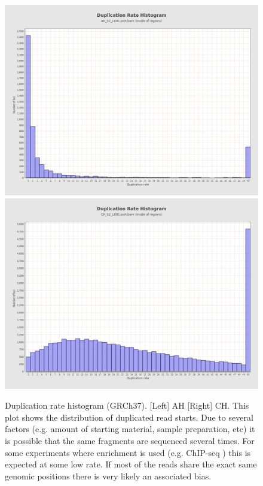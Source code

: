 \documentclass{article}
\begin{document}
\begin{figure}[ht] \hspace*{0cm} 
\begin{center}
    \includegraphics[scale=0.12]{qualimap/AH_S1_L001.sort_stats/images_qualimapReport/genome_uniq_read_starts_histogram}
        \includegraphics[scale=0.12]{qualimap/CH_S2_L001.sort_stats/images_qualimapReport/genome_uniq_read_starts_histogram}
	\caption{
	Duplication rate histogram (GRCh37). [Left] AH [Right] CH.
	This plot shows the distribution of duplicated read starts. Due to several factors (e.g. amount of starting material, sample preparation, etc) it is possible that the same fragments are sequenced several times. For some experiments where enrichment is used (e.g. ChIP-seq ) this is expected at some low rate. If most of the reads share the exact same genomic positions there is very likely an associated bias.
	}
	\label{fig:qualimap_dup_hist}
\end{center}
\end{figure}
\end{document}
